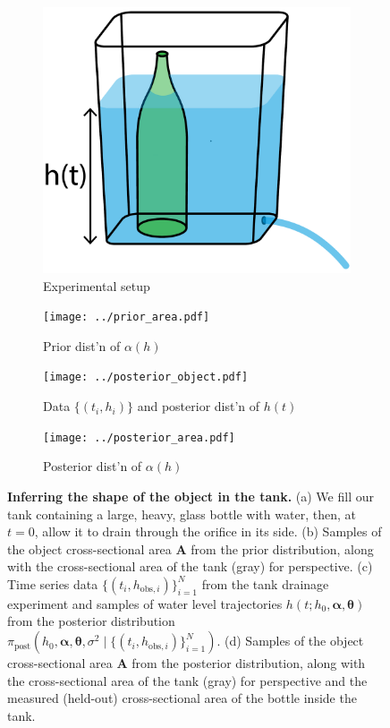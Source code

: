 \documentclass[openacc]{rsproca_new}%
\newcommand\thedata {$\{(t_i,h_{\text{obs}, i})\}_{i=1}^{N}$\xspace}
\newcommand\thedatanomath {\{(t_i,h_{\text{obs}, i})\}_{i=1}^{N}}
\newcommand\themodel {$h(t; h_0, \boldsymbol \alpha, \boldsymbol\theta)$\xspace}
\newcommand\thevars{h_0, \boldsymbol \alpha, \boldsymbol \theta, \sigma^2}
\begin{document}
\begin{figure}[h!]
    \centering
        \begin{subfigure}[b]{0.3\textwidth}
    	\includegraphics[width=\textwidth]{../tank_geometry/tank_w_bottle.pdf}
	\caption{Experimental setup} \label{fig:tank_w_bottle}
    \end{subfigure}
     \begin{subfigure}[b]{0.49\textwidth}
    	\texttt{[image: ../prior\_area.pdf]}
	\caption{Prior dist'n of $\alpha(h)$} \label{fig:prior_area}
    \end{subfigure}
    
     \begin{subfigure}[b]{0.49\textwidth}
    	\texttt{[image: ../posterior\_object.pdf]}
	\caption{Data $\{(t_i, h_i)\}$ and posterior dist'n of $h(t)$} \label{fig:posterior_object}
    \end{subfigure}
       \begin{subfigure}[b]{0.49\textwidth}
    	\texttt{[image: ../posterior\_area.pdf]}
	\caption{Posterior dist'n of $\alpha(h)$} \label{fig:posterior_area.pdf}
    \end{subfigure}
    \caption{
      \textbf{Inferring the shape of the object in the tank.} 
      (a) We fill our tank containing a large, heavy, glass bottle with water, then, at $t=0$, allow it to drain through the orifice in its side.
      (b) Samples of the object cross-sectional area $\mathbf{A}$ from the prior distribution, along with the cross-sectional area of the tank (gray) for perspective. 
      (c) Time series data \thedata from the tank drainage experiment and samples of water level trajectories \themodel from the posterior distribution $\pi_{\text{post}}(\thevars \mid \thedatanomath)$.
      (d) Samples of the object cross-sectional area $\mathbf{A}$ from the posterior distribution, along with the cross-sectional area of the tank (gray) for perspective and the measured (held-out) cross-sectional area of the bottle inside the tank. 
      }
\end{figure}
\end{document}
